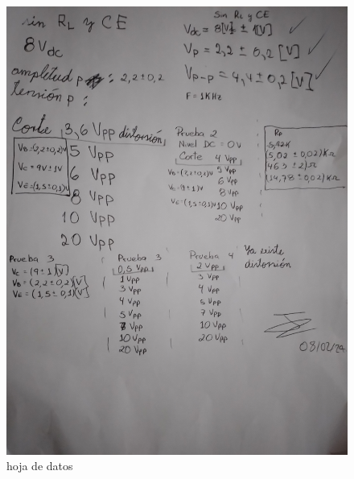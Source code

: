 \documentclass[12pt, a4paper]{article}
\begin{document}
    \begin{figure}
        \centering
        \includegraphics[height=10cm\textwidth]{hoda1.jpg}
        \caption{hoja de datos}
        \label{fig:hd1}
    \end{figure}
\end{document}
